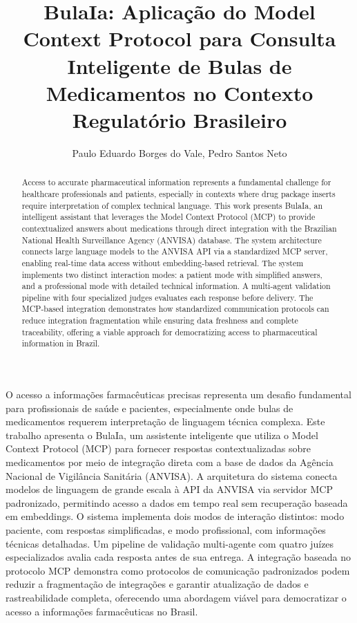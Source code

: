 \documentclass[12pt]{article}
\title{BulaIa: Aplicação do Model Context Protocol para Consulta Inteligente de Bulas de Medicamentos no Contexto Regulatório Brasileiro}
\author{Paulo Eduardo Borges do Vale\inst{1}, Pedro Santos Neto\inst{1}}
\begin{document}
\maketitle

\begin{abstract}
Access to accurate pharmaceutical information represents a fundamental challenge for healthcare professionals and patients, especially in contexts where drug package inserts require interpretation of complex technical language. This work presents BulaIa, an intelligent assistant that leverages the Model Context Protocol (MCP) to provide contextualized answers about medications through direct integration with the Brazilian National Health Surveillance Agency (ANVISA) database. The system architecture connects large language models to the ANVISA API via a standardized MCP server, enabling real-time data access without embedding-based retrieval. The system implements two distinct interaction modes: a patient mode with simplified answers, and a professional mode with detailed technical information. A multi-agent validation pipeline with four specialized judges evaluates each response before delivery. The MCP-based integration demonstrates how standardized communication protocols can reduce integration fragmentation while ensuring data freshness and complete traceability, offering a viable approach for democratizing access to pharmaceutical information in Brazil.
\end{abstract}

\begin{resumo}
O acesso a informações farmacêuticas precisas representa um desafio fundamental para profissionais de saúde e pacientes, especialmente onde bulas de medicamentos requerem interpretação de linguagem técnica complexa. Este trabalho apresenta o BulaIa, um assistente inteligente que utiliza o Model Context Protocol (MCP) para fornecer respostas contextualizadas sobre medicamentos por meio de integração direta com a base de dados da Agência Nacional de Vigilância Sanitária (ANVISA). A arquitetura do sistema conecta modelos de linguagem de grande escala à API da ANVISA via servidor MCP padronizado, permitindo acesso a dados em tempo real sem recuperação baseada em embeddings. O sistema implementa dois modos de interação distintos: modo paciente, com respostas simplificadas, e modo profissional, com informações técnicas detalhadas. Um pipeline de validação multi-agente com quatro juízes especializados avalia cada resposta antes de sua entrega. A integração baseada no protocolo MCP demonstra como protocolos de comunicação padronizados podem reduzir a fragmentação de integrações e garantir atualização de dados e rastreabilidade completa, oferecendo uma abordagem viável para democratizar o acesso a informações farmacêuticas no Brasil.
\end{resumo}
\end{document}
